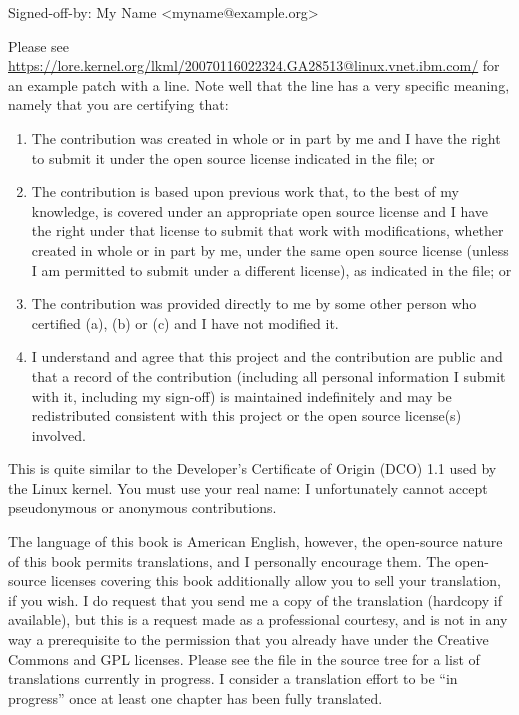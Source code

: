 \begin{VerbatimU}
Signed-off-by: My Name <myname@example.org>
\end{VerbatimU}

Please see \url{https://lore.kernel.org/lkml/20070116022324.GA28513@linux.vnet.ibm.com/} for an example
patch with a  line.
Note well that the  line has a very specific meaning,
namely that you are certifying that:

\begin{enumerate}[label={(\alph*)}]
\item	The contribution was created in whole or in part
	by me and I have the right to submit it under
	the open source license indicated in the file; or
\item	The contribution is based upon previous work
	that, to the best of my knowledge, is covered
	under an appropriate open source license and I
	have the right under that license to submit that
	work with modifications, whether created in whole
	or in part by me, under the same open source
	license (unless I am permitted to submit under
	a different license), as indicated in the file; or
\item	The contribution was provided directly to me by
	some other person who certified (a), (b) or (c)
	and I have not modified it.
\item	I understand and agree that this project and the
	contribution are public and that a record of the
	contribution (including all personal information
	I submit with it, including my sign-off) is
	maintained indefinitely and may be redistributed
	consistent with this project or the open source
	license(s) involved.
\end{enumerate}

This is quite similar to the Developer's Certificate of Origin (DCO)
1.1 used by the Linux kernel.
You must use your real name:
I unfortunately cannot accept pseudonymous or anonymous contributions.

The language of this book is American English, however, the open-source
nature of this book permits translations, and I personally encourage them.
The open-source licenses covering this book additionally allow you
to sell your translation, if you wish.
I do request that you send me a copy of the translation (hardcopy if
available), but this is a request made as a professional courtesy,
and is not in any way a prerequisite to the permission that you already
have under the Creative Commons and GPL licenses.
Please see the  file in the source tree for a list of
translations currently in progress.
I consider a translation effort to be ``in progress'' once at least one
chapter has been fully translated.

